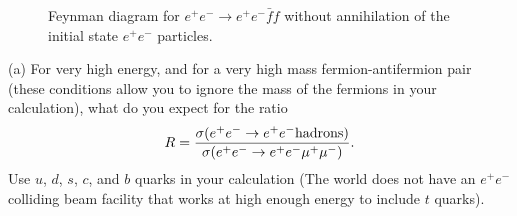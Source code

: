 \begin{figure}[H]
\begin{center}
\end{center} 
\caption{Feynman diagram for $e^{+}e^{-} \rightarrow e^{+}e^{-}\bar{f}f$ without annihilation of the initial state $e^{+}e^{-}$ particles.}
\label{fig:prob3-fig}
\end{figure}


(a) For very high energy, and for a very high mass fermion-antifermion pair (these conditions allow you to ignore the mass of the fermions in your calculation), what do you expect for the ratio
\begin{eqnarray}
    \label{eq:ratio}
    R = \frac{\sigma(e^{+}e^{-} \rightarrow e^{+}e^{-}{\rm hadrons})}{\sigma(e^{+}e^{-} \rightarrow e^{+}e^{-}\mu^{+}\mu^{-})}
.\end{eqnarray}
Use $u$, $d$, $s$, $c$, and $b$ quarks in your calculation (The world does not have an $e^{+}e^{-}$ colliding beam facility that works at high enough energy to include $t$ quarks).

